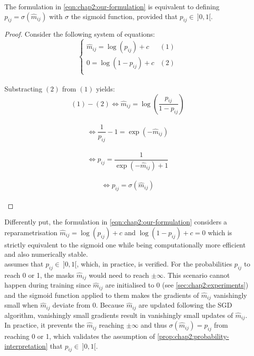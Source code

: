 \begin{proposition}
  \label{prop:chap2:probability-interpretation}
  The formulation in \cref{eqn:chap2:our-formulation} is equivalent to defining
  $p_{ij} = \sigma(\hat{m}_{ij})$ with $\sigma$ the sigmoid function,
  provided that $p_{ij}\in ~ ]0,1[$.
\end{proposition}
\vspace*{\baselineskip}

\begin{proof}
  Consider the following system of equations:\\
  $$
    \left\{
    \begin{array}{ll}
      \hat{m}_{ij} = \log(p_{ij})+c & (1) \\
      0 = \log(1-p_{ij})+c               & (2) \\
    \end{array}
    \right.
  $$\\
  Substracting $(2)$ from $(1)$ yields:\\
  $$ (1) - (2) \Leftrightarrow \hat{m}_{ij} = \displaystyle\log\left( \frac{p_{ij}}{1 - p_{ij}} \right)$$\\
  $$ \Leftrightarrow \frac{1}{p_{ij}} - 1 = \exp(-\hat{m}_{ij})$$\\
  $$ \Leftrightarrow p_{ij} = \frac{1}{\exp(-\hat{m}_{ij}) + 1}$$\\
  $$ \Leftrightarrow p_{ij} = \sigma(\hat{m}_{ij})$$\\

\end{proof}


Differently put, the formulation in \cref{eqn:chap2:our-formulation} considers a
reparametrisation $\hat{m}_{ij} = \log(p_{ij})+c$ and $\log(1-p_{ij})+ c =0$ which is strictly
equivalent to the sigmoid one while being computationally more efficient and
also numerically stable.\\


 assumes that $p_{ij}\in ~ ]0,1[$,
which, in practice, is verified. For the probabilities $p_{ij}$ to reach 0 or 1,
the masks $\hat{m}_{ij}$  would need to reach $\pm\infty$. This scenario
cannot happen during training since $\hat{m}_{ij}$ are initialised to 0
(see \cref{sec:chap2:experiments}) and the sigmoid function applied to them
makes the gradients of $\hat{m}_{ij}$ vanishingly small when
$\hat{m}_{ij}$ deviate from 0. Because $\hat{m}_{ij}$ are updated
following the \ac{SGD} algorithm, vanishingly small gradients result in
vanishingly small updates of $\hat{m}_{ij}$. In practice, it prevents the
$\hat{m}_{ij}$ reaching $\pm\infty$ and thus
$\sigma(\hat{m}_{ij})=p_{ij}$ from reaching 0 or 1, which validates the
assumption of \cref{prop:chap2:probability-interpretation} that $p_{ij}\in ~
]0,1[$.\\

